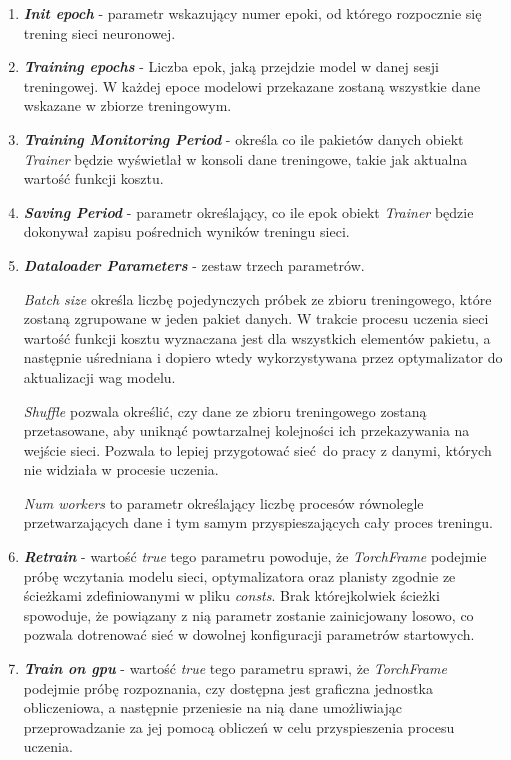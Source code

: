 \begin{enumerate}
    \item \textbf{\textit{Init epoch}} - parametr wskazujący numer epoki, od którego
    rozpocznie się trening sieci neuronowej.

    \item \textbf{\textit{Training epochs}} - Liczba epok, jaką przejdzie model w danej
    sesji treningowej. W każdej epoce modelowi przekazane zostaną wszystkie dane
    wskazane w zbiorze treningowym.

    \item \textbf{\textit{Training Monitoring Period}} - określa co ile pakietów danych
    obiekt \textit{Trainer} będzie wyświetlał w konsoli dane treningowe, takie jak
    aktualna wartość funkcji kosztu.

    \item \textbf{\textit{Saving Period}} - parametr określający, co ile epok
    obiekt \textit{Trainer} będzie dokonywał zapisu pośrednich wyników treningu sieci.

    \item \textbf{\textit{Dataloader Parameters}} - zestaw trzech parametrów.

    \textit{Batch size} określa liczbę pojedynczych próbek ze zbioru treningowego, które zostaną zgrupowane
    w jeden pakiet danych. W trakcie procesu uczenia sieci wartość funkcji kosztu wyznaczana
    jest dla wszystkich elementów pakietu, a następnie uśredniana i dopiero wtedy
    wykorzystywana przez optymalizator do aktualizacji wag modelu.

    \textit{Shuffle} pozwala określić, czy dane ze zbioru treningowego zostaną
    przetasowane, aby uniknąć powtarzalnej kolejności ich przekazywania na wejście
    sieci. Pozwala to lepiej przygotować sieć do pracy z danymi, których nie widziała
    w procesie uczenia.

    \textit{Num workers} to parametr  określający liczbę procesów równolegle przetwarzających
    dane i tym samym przyspieszających cały proces treningu.

    \item \textbf{\textit{Retrain}} - wartość \textit{true} tego parametru powoduje, że
    \textit{TorchFrame} podejmie próbę wczytania modelu sieci, optymalizatora oraz
    planisty zgodnie ze ścieżkami zdefiniowanymi w pliku \textit{consts}. Brak którejkolwiek
    ścieżki spowoduje, że powiązany z nią parametr zostanie zainicjowany losowo, co pozwala
    dotrenować sieć w dowolnej konfiguracji parametrów startowych.

    \item \textbf{\textit{Train on gpu}} - wartość \textit{true} tego parametru sprawi, że
    \textit{TorchFrame} podejmie próbę rozpoznania, czy dostępna jest graficzna jednostka
    obliczeniowa, a następnie przeniesie na nią dane umożliwiając przeprowadzanie
    za jej pomocą obliczeń w celu przyspieszenia procesu uczenia.


\end{enumerate}
